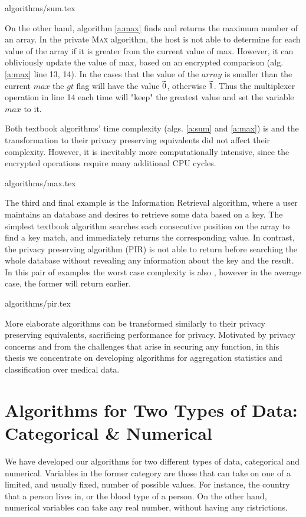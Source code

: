 {algorithms/sum.tex}


On the other hand, algorithm \ref{a:max} finds and returns the maximum number of an array.
In the private {\textsc{Max}} algorithm, the host is not able to determine for each value of the array if it is greater from the current value of max.
However, it can obliviously update the value of max, based on an encrypted comparison (alg. \ref{a:max} line 13, 14).
In the cases that the value of the $array$ is smaller than the current $max$ the $gt$ flag will have the value $\widetilde{0}$, otherwise $\widetilde{1}$.
Thus the multiplexer operation in line 14 each time will "keep" the greatest value and set the variable $max$ to it.

Both textbook algorithms' time complexity (algs. \ref{a:sum} and \ref{a:max}) is  and the transformation to their privacy preserving equivalents did not affect their complexity.
However, it is inevitably more computationally intensive, since the encrypted operations require many additional CPU cycles.

{algorithms/max.tex}


The third and final example is the Information Retrieval algorithm, where a user maintains an database and desires to retrieve some data based on a key.
The simplest textbook algorithm searches each consecutive position on the array to find a key match, and immediately returns the corresponding value.
In contrast, the privacy preserving algorithm (PIR) is not able to return before searching the whole database without revealing any information about the key and the result.
In this pair of examples the worst case complexity is also , however in the average case, the former will return earlier.


{algorithms/pir.tex}


More elaborate algorithms can be transformed similarly to their privacy preserving equivalents, sacrificing performance for privacy.
Motivated by privacy concerns and from the challenges that arise in securing any function, in this thesis we concentrate on developing algorithms for aggregation statistics and classification over medical data.




\section{Algorithms for Two Types of Data: Categorical \& Numerical}\label{s:two-types-of-data}
We have developed our algorithms for two different types of data, categorical and numerical.
Variables in the former category are those that can take on one of a limited, and usually fixed, number of possible values.
For instance, the country that a person lives in, or the blood type of a person.
On the other hand, numerical variables can take any real number, without having any ristrictions.


